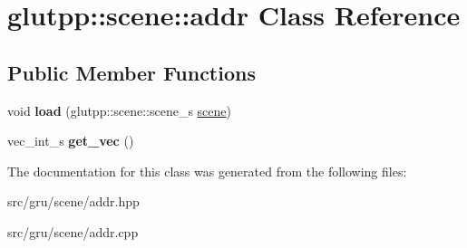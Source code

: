 \hypertarget{classglutpp_1_1scene_1_1addr}{\section{glutpp\-:\-:scene\-:\-:addr \-Class \-Reference}
\label{classglutpp_1_1scene_1_1addr}
}
\subsection*{\-Public \-Member \-Functions}
\begin{DoxyCompactItemize}
\item 
\hypertarget{classglutpp_1_1scene_1_1addr_a96310acb21bc6e842d07292ba91ce7fc}{void {\bfseries load} (glutpp\-::scene\-::scene\-\_\-s \hyperlink{classglutpp_1_1scene_1_1scene}{scene})}\label{classglutpp_1_1scene_1_1addr_a96310acb21bc6e842d07292ba91ce7fc}

\item 
\hypertarget{classglutpp_1_1scene_1_1addr_a2ace92e61407126bcda0e841cd9720b2}{vec\-\_\-int\-\_\-s {\bfseries get\-\_\-vec} ()}\label{classglutpp_1_1scene_1_1addr_a2ace92e61407126bcda0e841cd9720b2}

\end{DoxyCompactItemize}


\-The documentation for this class was generated from the following files\-:\begin{DoxyCompactItemize}
\item 
src/gru/scene/addr.\-hpp\item 
src/gru/scene/addr.\-cpp\end{DoxyCompactItemize}
